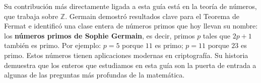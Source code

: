 \documentclass[11pt, letterpaper]{article}
\begin{document}
\begin{tcolorbox}
\begin{minipage}[t]{0.78\linewidth}
\medskip
Su contribuci\'on m\'as directamente ligada a esta gu\'ia est\'a en la teor\'ia de n\'umeros, que trabaja sobre $\mathbb{Z}$. Germain demostr\'o resultados clave para el Teorema de Fermat e identific\'o una clase entera de n\'umeros primos que hoy llevan su nombre: los \textbf{n\'umeros primos de Sophie Germain}, es decir, primos $p$ tales que $2p+1$ tambi\'en es primo. Por ejemplo: $p=5$ porque $11$ es primo; $p=11$ porque $23$ es primo. Estos n\'umeros tienen aplicaciones modernas en criptograf\'ia. Su historia demuestra que los enteros que estudiamos en esta gu\'ia son la puerta de entrada a algunas de las preguntas m\'as profundas de la matem\'atica.
\end{minipage}
\end{tcolorbox}

\vspace{0.7cm}
\end{document}
